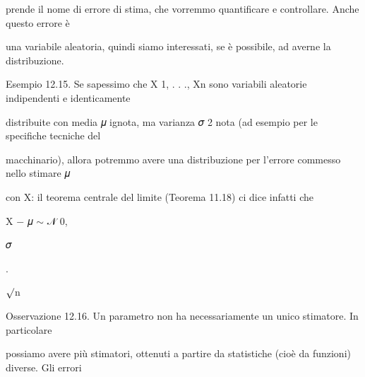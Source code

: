 \documentclass[a4paper,portrait,12pt]{article}
\begin{document}
\begin{flushleft}
prende il nome di errore di stima, che vorremmo quantificare e controllare. Anche questo errore \`{e}
\end{flushleft}


\begin{flushleft}
una variabile aleatoria, quindi siamo interessati, se \`{e} possibile, ad averne la distribuzione.
\end{flushleft}


\begin{flushleft}
Esempio 12.15. Se sapessimo che X 1, . . ., Xn sono variabili aleatorie indipendenti e identicamente
\end{flushleft}


\begin{flushleft}
distribuite con media 𝜇 ignota, ma varianza 𝜎 2 nota (ad esempio per le specifiche tecniche del
\end{flushleft}


\begin{flushleft}
macchinario), allora potremmo avere una distribuzione per l'errore commesso nello stimare 𝜇
\end{flushleft}


\begin{flushleft}
con X: il teorema centrale del limite (Teorema 11.18) ci dice infatti che
\end{flushleft}


\begin{flushleft}
X $-$ 𝜇 $\sim$ 𝒩 0,
\end{flushleft}





\begin{flushleft}
𝜎
\end{flushleft}


.


\begin{flushleft}
$\surd$n
\end{flushleft}





\begin{flushleft}
Osservazione 12.16. Un parametro non ha necessariamente un unico stimatore. In particolare
\end{flushleft}


\begin{flushleft}
possiamo avere più stimatori, ottenuti a partire da statistiche (cio\`{e} da funzioni) diverse. Gli errori
\end{flushleft}
\end{document}
